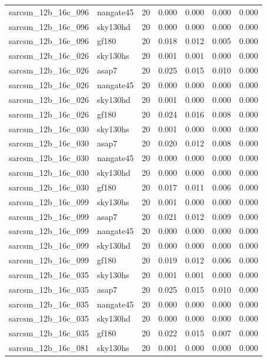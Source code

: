 \begin{tabular}{llrrrrr}
sarcsm\_12b\_16c\_096 & nangate45 & 20 & 0.000 & 0.000 & 0.000 & 0.000 \\
sarcsm\_12b\_16c\_096 & sky130hd & 20 & 0.000 & 0.000 & 0.000 & 0.000 \\
sarcsm\_12b\_16c\_096 & gf180 & 20 & 0.018 & 0.012 & 0.005 & 0.000 \\
sarcsm\_12b\_16c\_026 & sky130hs & 20 & 0.001 & 0.001 & 0.000 & 0.000 \\
sarcsm\_12b\_16c\_026 & asap7 & 20 & 0.025 & 0.015 & 0.010 & 0.000 \\
sarcsm\_12b\_16c\_026 & nangate45 & 20 & 0.000 & 0.000 & 0.000 & 0.000 \\
sarcsm\_12b\_16c\_026 & sky130hd & 20 & 0.001 & 0.000 & 0.000 & 0.000 \\
sarcsm\_12b\_16c\_026 & gf180 & 20 & 0.024 & 0.016 & 0.008 & 0.000 \\
sarcsm\_12b\_16c\_030 & sky130hs & 20 & 0.001 & 0.000 & 0.000 & 0.000 \\
sarcsm\_12b\_16c\_030 & asap7 & 20 & 0.020 & 0.012 & 0.008 & 0.000 \\
sarcsm\_12b\_16c\_030 & nangate45 & 20 & 0.000 & 0.000 & 0.000 & 0.000 \\
sarcsm\_12b\_16c\_030 & sky130hd & 20 & 0.000 & 0.000 & 0.000 & 0.000 \\
sarcsm\_12b\_16c\_030 & gf180 & 20 & 0.017 & 0.011 & 0.006 & 0.000 \\
sarcsm\_12b\_16c\_099 & sky130hs & 20 & 0.001 & 0.000 & 0.000 & 0.000 \\
sarcsm\_12b\_16c\_099 & asap7 & 20 & 0.021 & 0.012 & 0.009 & 0.000 \\
sarcsm\_12b\_16c\_099 & nangate45 & 20 & 0.000 & 0.000 & 0.000 & 0.000 \\
sarcsm\_12b\_16c\_099 & sky130hd & 20 & 0.000 & 0.000 & 0.000 & 0.000 \\
sarcsm\_12b\_16c\_099 & gf180 & 20 & 0.019 & 0.012 & 0.006 & 0.000 \\
sarcsm\_12b\_16c\_035 & sky130hs & 20 & 0.001 & 0.001 & 0.000 & 0.000 \\
sarcsm\_12b\_16c\_035 & asap7 & 20 & 0.025 & 0.015 & 0.010 & 0.000 \\
sarcsm\_12b\_16c\_035 & nangate45 & 20 & 0.000 & 0.000 & 0.000 & 0.000 \\
sarcsm\_12b\_16c\_035 & sky130hd & 20 & 0.000 & 0.000 & 0.000 & 0.000 \\
sarcsm\_12b\_16c\_035 & gf180 & 20 & 0.022 & 0.015 & 0.007 & 0.000 \\
sarcsm\_12b\_16c\_081 & sky130hs & 20 & 0.001 & 0.000 & 0.000 & 0.000 \\

\end{tabular}
